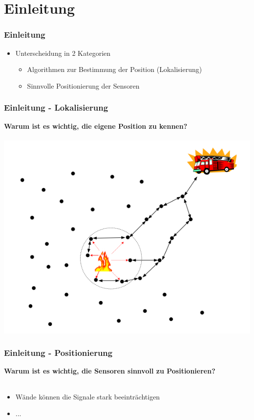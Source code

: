 \section{Einleitung}
\label{sec:einleitung}

\begin{frame}
  \frametitle{Einleitung}

  \begin{itemize}
  \item Unterscheidung in 2 Kategorien
    \begin{itemize}
    \item Algorithmen zur Bestimmung der Position (Lokalisierung)
    \item Sinnvolle Positionierung der Sensoren
    \end{itemize}
  \end{itemize}
\end{frame}

\begin{frame}
  \frametitle{Einleitung - Lokalisierung}

  \begin{center}
    \textbf{Warum ist es wichtig, die eigene Position zu kennen?}\\~\\

    \includegraphics[scale=0.35]{img/lokalisierung_1}
  \end{center}
\end{frame}

\begin{frame}
  \frametitle{Einleitung - Positionierung}

  \begin{center}
    \textbf{Warum ist es wichtig, die Sensoren sinnvoll zu
      Positionieren?}\\~\\
  \end{center}

  \begin{itemize}
  \item Wände können die Signale stark beeinträchtigen
  \item ...
  \end{itemize}
\end{frame}